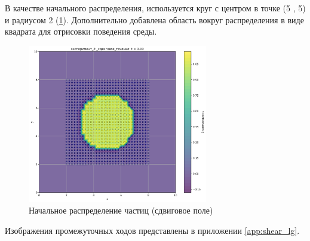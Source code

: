 В качестве начального распределения, используется круг с центром в точке (5 , 5) и радиусом 2 (\ref{fig:lg_shaer_begin}). Дополнительно добавлена область вокруг распределения в виде квадрата для отрисовки поведения среды.
\begin{figure}
	\centering
	\includegraphics[width=0.7\textwidth]{imgs/lg/эксперимент_2:_сдвиговое_течение_t0.00.png}
	\caption{Начальное распределение частиц (сдвиговое поле)}
	\label{fig:lg_shaer_begin}
\end{figure}

Изображения промежуточных ходов представлены в приложении \ref{app:shear_lg}.

